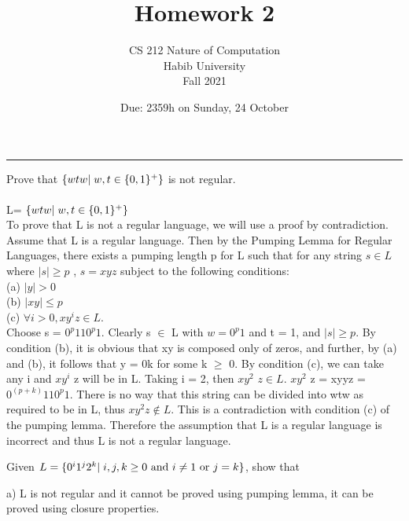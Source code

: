 \documentclass[a4page]{exam}
\title{Homework 2}
\author{CS 212 Nature of Computation\\Habib University\\Fall 2021}
\date{Due: 2359h on Sunday, 24 October}
\begin{document}
\maketitle
\thispagestyle{empty}

\noindent\rule{\textwidth}{1pt}

\begin{questions}
\question[10] Prove that $\{wtw | \hspace{1mm} w,t \in \{0,1\}^+\}$ is not regular.
\\
\\
L= $\{wtw | \hspace{1mm} w,t \in \{0,1\}^+\}$\\
 To prove that L is not a regular language, we will use a proof by contradiction. Assume
that L is a regular language. Then by the Pumping Lemma for Regular Languages,
there exists a pumping length p for L such that for any string $s \in L$  where $|s| \geq p $ ,
$s = xyz$ subject to the following conditions:\\
(a) $|y| > 0$\\
(b) $|xy| \leq p $\\
(c) $\forall i > 0, xy^i z \in L$.\\
Choose s = $0^p110^p1$. Clearly s $\in$ L with $w = 0^p1$ and t = 1, and $|s| \geq p$. By condition
(b), it is obvious that xy is composed only of zeros, and further, by (a) and (b), it
follows that y = 0k
for some k $\geq$ 0. By condition (c), we can take any i and $xy^i$
z will
be in L. Taking i = 2, then $xy^2$
$z \in L$. $xy^2$
z = xyyz = $0^{(p+k)}110^p1.$ There is no way
that this string can be divided into wtw as required to be in L, thus $xy^2 z \notin L$. This is
a contradiction with condition (c) of the pumping lemma. Therefore the assumption
that L is a regular language is incorrect and thus L is not a regular language.

\question Given $L = \{0^i1^j2^k | \hspace{1mm} i,j,k \geq 0 \text{ and } i \neq 1 \text{ or } j = k\}$, show that 
a) L is not regular and it cannot be proved using pumping lemma, it can be proved using closure properties.


\end{questions}
\end{document}
